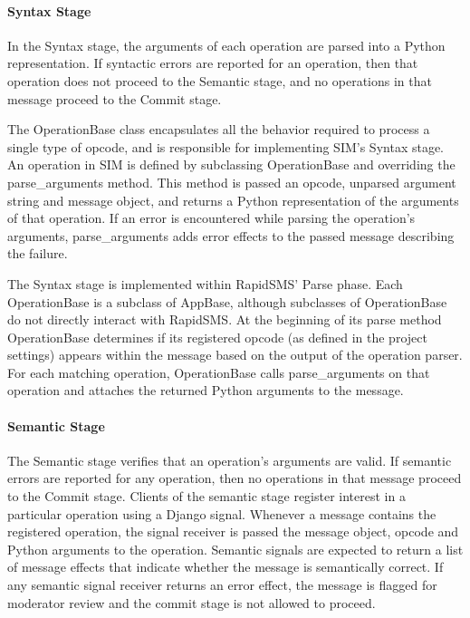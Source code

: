\documentclass{acm_proc_article-sp}
\begin{document}
\paragraph{Syntax Stage}

In the Syntax stage, the arguments of each operation are parsed into a Python representation. If syntactic errors are reported for an operation, then that operation does not proceed to the Semantic stage, and no operations in that message proceed to the Commit stage.

The OperationBase class encapsulates all the behavior required to process a single type of opcode, and is responsible for implementing SIM's Syntax stage. An operation in SIM is defined by subclassing OperationBase and overriding the parse\_arguments method. This method is passed an opcode, unparsed argument string and message object, and returns a Python representation of the arguments of that operation. If an error is encountered while parsing the operation's arguments, parse\_arguments adds error effects to the passed message describing the failure.

The Syntax stage is implemented within RapidSMS' Parse phase. Each OperationBase is a subclass of AppBase, although subclasses of OperationBase do not directly interact with RapidSMS. At the beginning of its parse method OperationBase determines if its registered opcode (as defined in the project settings) appears within the message based on the output of the operation parser. For each matching operation, OperationBase calls parse\_arguments on that operation and attaches the returned Python arguments to the message.

\paragraph{Semantic Stage}

The Semantic stage verifies that an operation's arguments are valid. If semantic errors are reported for any operation, then no operations in that message proceed to the Commit stage. Clients of the semantic stage register interest in a particular operation using a Django signal. Whenever a message contains the registered operation, the signal receiver is passed the message object, opcode and Python arguments to the operation. Semantic signals are expected to return a list of message effects that indicate whether the message is semantically correct. If any semantic signal receiver returns an error effect, the message is flagged for moderator review and the commit stage is not allowed to proceed.
\end{document}
